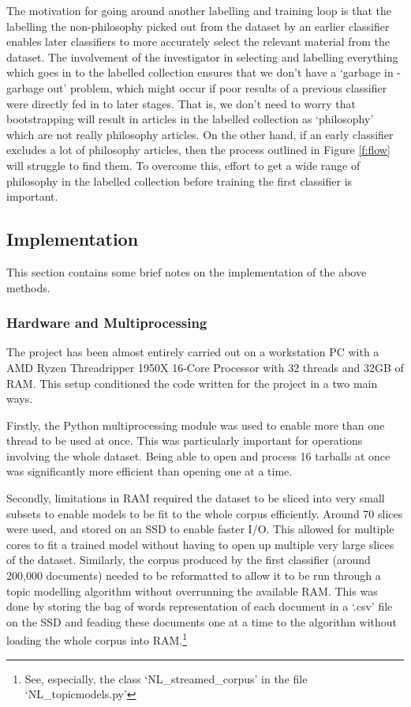 \documentclass{article}
\begin{document}
The motivation for going around another labelling and training loop is that the labelling the non-philosophy picked out from the dataset by an earlier classifier enables later classifiers to more accurately select the relevant material from the dataset. The involvement of the investigator in selecting and labelling everything which goes in to the labelled collection ensures that we don't have a `garbage in - garbage out' problem, which might occur if poor results of a previous classifier were directly fed in to later stages. That is, we don't need to worry that bootstrapping will result in articles in the labelled collection as `philosophy' which are not really philosophy articles. On the other hand, if an early classifier excludes a lot of philosophy articles, then the process outlined in Figure \ref{f:flow} will struggle to find them. To overcome this, effort to get a wide range of philosophy in the labelled collection before training the first classifier is important.

\subsection{Implementation}\label{s:corpus-implementation}

This section contains some brief notes on the implementation of the above methods.

\subsubsection{Hardware and Multiprocessing}\label{s:corpus-implementation-multi}

The project has been almost entirely carried out on a workstation PC with a AMD Ryzen Threadripper 1950X 16-Core Processor with 32 threads and 32GB of RAM. This setup conditioned the code written for the project in a two main ways.

Firstly, the Python multiprocessing module was used to enable more than one thread to be used at once. This was particularly important for operations involving the whole dataset. Being able to open and process 16 tarballs at once was significantly more efficient than opening one at a time.

Secondly, limitations in RAM required the dataset to be sliced into very small subsets to enable models to be fit to the whole corpus efficiently. Around 70 slices were used, and stored on an SSD to enable faster I/O. This allowed for multiple cores to fit a trained model without having to open up multiple very large slices of the dataset. Similarly, the corpus produced by the first classifier (around 200,000 documents) needed to be reformatted to allow it to be run through a topic modelling algorithm without overrunning the available RAM. This was done by storing the bag of words representation of each document in a `.csv' file on the SSD and feading these documents one at a time to the algorithm without loading the whole corpus into RAM.\footnote{See, especially, the class `NL\_\-streamed\_\-corpus' in the file `NL\_\-topicmodels.py'}
\end{document}
